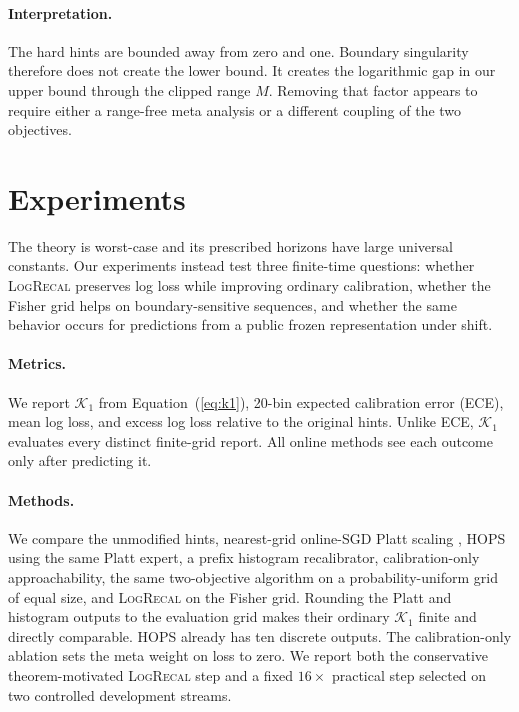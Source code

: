 \documentclass{article}
\newcommand{\method}{\textsc{LogRecal}\xspace}
\newcommand{\calK}{\mathcal{K}}
\begin{document}
\paragraph{Interpretation.}
The hard hints are bounded away from zero and one. Boundary singularity therefore does not create the lower bound. It creates the logarithmic gap in our upper bound through the clipped range $M$. Removing that factor appears to require either a range-free meta analysis or a different coupling of the two objectives.

\section{Experiments}
\label{sec:experiments}

The theory is worst-case and its prescribed horizons have large universal constants. Our experiments instead test three finite-time questions: whether \method preserves log loss while improving ordinary calibration, whether the Fisher grid helps on boundary-sensitive sequences, and whether the same behavior occurs for predictions from a public frozen representation under shift.

\paragraph{Metrics.}
We report $\calK_1$ from Equation~(\ref{eq:k1}), 20-bin expected calibration error (ECE), mean log loss, and excess log loss relative to the original hints. Unlike ECE, $\calK_1$ evaluates every distinct finite-grid report. All online methods see each outcome only after predicting it.

\paragraph{Methods.}
We compare the unmodified hints, nearest-grid online-SGD Platt scaling \citep{platt1999probabilistic}, HOPS \citep{gupta2023online} using the same Platt expert, a prefix histogram recalibrator, calibration-only approachability, the same two-objective algorithm on a probability-uniform grid of equal size, and \method on the Fisher grid. Rounding the Platt and histogram outputs to the evaluation grid makes their ordinary $\calK_1$ finite and directly comparable. HOPS already has ten discrete outputs. The calibration-only ablation sets the meta weight on loss to zero. We report both the conservative theorem-motivated \method step and a fixed $16\times$ practical step selected on two controlled development streams.
\end{document}
